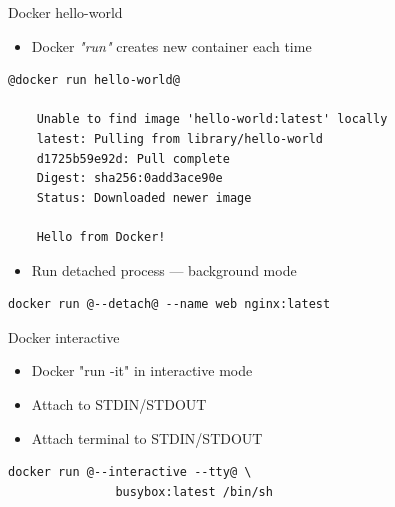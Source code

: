 \begin{frame}[fragile]{Docker hello-world}  
  \begin{itemize}
    \item Docker {\it "run"} creates new container each time
  \end{itemize}
  \begin{lstlisting}[basicstyle=\ttfamily\small\color{myblue}]
    @docker run hello-world@

    Unable to find image 'hello-world:latest' locally
    latest: Pulling from library/hello-world
    d1725b59e92d: Pull complete
    Digest: sha256:0add3ace90e
    Status: Downloaded newer image 

    Hello from Docker!
  \end{lstlisting}  
  \begin{itemize}
    \item Run detached process --- background mode
  \end{itemize}
  \begin{lstlisting}[basicstyle=\ttfamily\small\color{myblue}]
    docker run @--detach@ --name web nginx:latest
  \end{lstlisting}
\end{frame}

\begin{frame}[fragile]{Docker interactive}
\begin{itemize}
    \item Docker "run -it" in interactive mode
    \item Attach to STDIN/STDOUT
    \item Attach terminal to STDIN/STDOUT
  \end{itemize}  
  \begin{lstlisting}[basicstyle=\ttfamily\color{myblue}]
    docker run @--interactive --tty@ \
               busybox:latest /bin/sh
  \end{lstlisting}
\end{frame}

